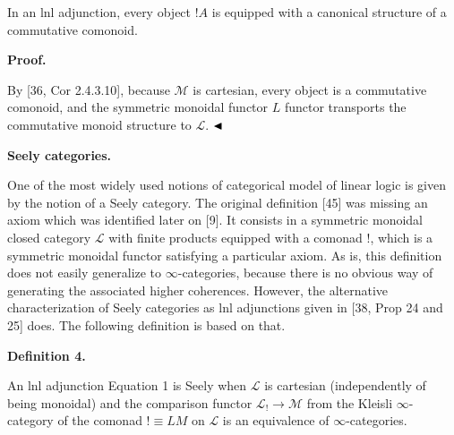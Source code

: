 In an lnl adjunction, every object $\mathop{!}A$ is equipped with a canonical structure of a commutative comonoid.\par
 
 
 
 
\par\medskip\noindent\textbf{Proof.}\par
 
 
By [36, Cor 2.4.3.10], because ${\mathcal{M}}$ is cartesian, every object is a commutative comonoid, and the symmetric monoidal functor $L$ functor transports the commutative monoid structure to ${\mathcal{L}}$. $\hfill\blacktriangleleft$\par
 
 
 
 
\par\medskip\noindent\textbf{Seely categories.}\par
 
 
One of the most widely used notions of categorical model of linear logic is given by the notion of a Seely category. The original definition [45] was missing an axiom which was identified later on [9]. It consists in a symmetric monoidal closed category ${\mathcal{L}}$ with finite products equipped with a comonad $\mathop{!}$, which is a symmetric monoidal functor satisfying a particular axiom. As is, this definition does not easily generalize to $\infty$-categories, because there is no obvious way of generating the associated higher coherences. However, the alternative characterization of Seely categories as lnl adjunctions given in [38, Prop 24 and 25] does. The following definition is based on that.\par
 
 
 
\par\medskip\noindent\textbf{Definition 4.}\par
 
 
An lnl adjunction Equation 1 is Seely when ${\mathcal{L}}$ is cartesian (independently of being monoidal) and the comparison functor ${\mathcal{L}}_{\mathop{!}}\to{\mathcal{M}}$ from the Kleisli $\infty$-category of the comonad $\mathop{!}\equiv LM$ on ${\mathcal{L}}$ is an equivalence of $\infty$-categories.\par
 
